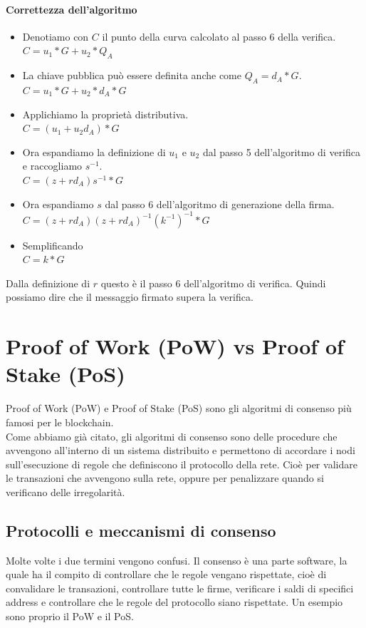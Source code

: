 \documentclass[a4paper,11pt]{report}
\begin{document}
\subsubsection{Correttezza dell'algoritmo}
\begin{itemize}
\item Denotiamo con $C$ il punto della curva calcolato al passo 6 della verifica.\\
$C=u_{1}*G+u_{2}*Q_{A}$
\item La chiave pubblica può essere definita anche come $Q_{A}=d_{A}*G$.\\
$C=u_{1}*G+u_{2}*d_{A}*G$
\item Applichiamo la proprietà distributiva.\\
$C=(u_{1}+u_{2}d_{A})*G$
\item Ora espandiamo la definizione di $u_{1}$ e $u_{2}$ dal passo 5 dell'algoritmo di verifica e raccogliamo $s^{-1}$.\\
$C=(z+rd_{A})s^{-1}*G$
\item Ora espandiamo $s$ dal passo 6 dell'algoritmo di generazione della firma.\\
$C=(z+rd_{A})(z+rd_{A})^{-1}(k^{-1})^{-1}*G$
\item Semplificando\\
$C=k*G$
\end{itemize}
Dalla definizione di $r$ questo è il passo 6 dell'algoritmo di verifica.
Quindi possiamo dire che il messaggio firmato supera la verifica.


\chapter{Proof of Work (PoW) vs Proof of Stake (PoS)}
Proof of Work (PoW) e Proof of Stake (PoS) sono gli algoritmi di consenso più famosi per le blockchain.\\
Come abbiamo già citato, gli algoritmi di consenso sono delle procedure che avvengono all'interno di un sistema distribuito e permettono di accordare i nodi sull'esecuzione di regole che definiscono il protocollo della rete. Cioè per validare le transazioni che avvengono sulla rete, oppure per penalizzare quando si verificano delle irregolarità.

\section{Protocolli e meccanismi di consenso}
Molte volte i due termini vengono confusi. Il consenso è una parte software, la quale ha il compito di controllare che le regole vengano rispettate, cioè di convalidare le transazioni, controllare tutte le firme, verificare i saldi di specifici address e controllare che le regole del protocollo siano rispettate. Un esempio sono proprio il PoW e il PoS.
\end{document}
